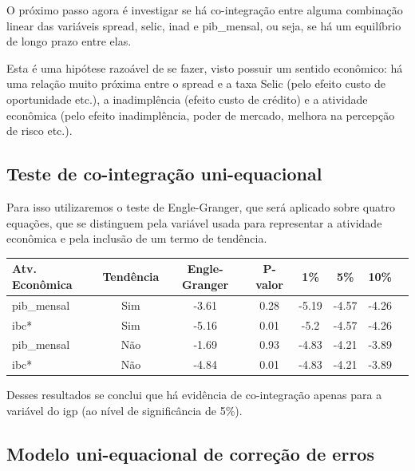 \documentclass[a4paper,
               article,
               12pt,
               openany,
               oneside,
               english,
               brazil]{abntex2}
\numberwithin{equation}{section}
\begin{document}
    O próximo passo agora é investigar se há co-integração entre alguma combinação linear das variáveis spread, selic, inad e pib\_mensal, ou seja, se há um equilíbrio de longo prazo entre elas.
    
    Esta é uma hipótese razoável de se fazer, visto possuir um sentido econômico: há uma relação muito próxima entre o spread e a taxa Selic (pelo efeito custo de oportunidade etc.), a inadimplência (efeito custo de crédito) e a atividade econômica (pelo efeito inadimplência, poder de mercado, melhora na percepção de risco etc.).

    \subsection{Teste de co-integração uni-equacional}

    Para isso utilizaremos o teste de Engle-Granger, que será aplicado sobre quatro equações, que se distinguem pela variável usada para representar a atividade econômica e pela inclusão de um termo de tendência.

    \begin{table}[ht]
        {%
            \begin{tabular}{lccccccc}
                \midrule
                Atv. Econômica & Tendência & Engle-Granger & P-valor & 1\% & 5\% & 10\% \\
                \midrule
                pib\_mensal & Sim & -3.61 & 0.28 & -5.19 & -4.57 & -4.26 \\
                ibc* & Sim & -5.16 & 0.01 & -5.2 & -4.57 & -4.26 \\
                pib\_mensal & Não & -1.69 & 0.93 & -4.83 & -4.21 & -3.89 \\
                ibc* & Não & -4.84 & 0.01 & -4.83 & -4.21 & -3.89 \\
                \midrule
            \end{tabular}
            } 
            {}
    \end{table}

    Desses resultados se conclui que há evidência de co-integração apenas para a variável do igp (ao nível de significância de 5\%).
    
    \subsection{Modelo uni-equacional de correção de erros}
\end{document}
